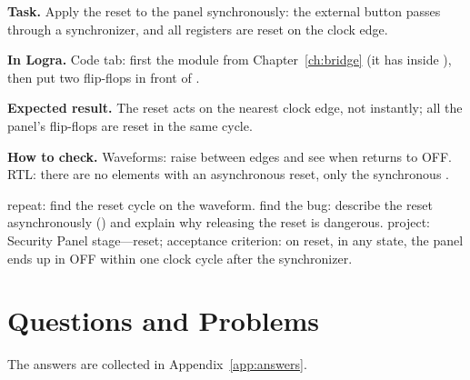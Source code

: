 \begin{diybox}
\textbf{Task.} Apply the reset to the panel synchronously: the external button passes through a synchronizer, and all registers are reset on the clock edge.

\textbf{In Logra.} Code tab: first the  module from Chapter~\ref{ch:bridge} (it has  inside ), then put two flip-flops in front of .

\textbf{Expected result.} The reset acts on the nearest clock edge, not instantly; all the panel's flip-flops are reset in the same cycle.

\textbf{How to check.} Waveforms: raise  between edges and see when  returns to OFF. RTL: there are no elements with an asynchronous reset, only the synchronous .

 repeat: find the reset cycle on the waveform.  find the bug: describe the reset asynchronously () and explain why releasing the reset is dangerous.  project: Security Panel stage---reset; acceptance criterion: on reset, in any state, the panel ends up in OFF within one clock cycle after the synchronizer.
\end{diybox}

\section{Questions and Problems}
\label{sec:tasks-clocks}

The answers are collected in Appendix~\ref{app:answers}.

